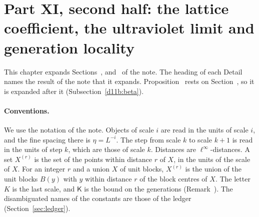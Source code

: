 


\section{Part XI, second half: the lattice coefficient, the ultraviolet limit and generation locality}\label{d11b}

This chapter expands Sections~,  and~ of the note. The heading of each Detail names the result of the note that it expands. Proposition~ rests on Section~, so it is expanded after it (Subsection~\ref{d11b:beta}).

\paragraph{Conventions.} We use the notation of the note. Objects of scale $i$ are read in the units of scale $i$, and the fine spacing there is $\eta=L^{-i}$. The step from scale $k$ to scale $k+1$ is read in the units of step $k$, which are those of scale $k$. Distances are $\ell^\infty$-distances. A set $X^{(r)}$ is the set of the points within distance $r$ of $X$, in the units of the scale of $X$. For an integer $r$ and a union $X$ of unit blocks, $X^{(r)}$ is the union of the unit blocks $B(y)$ with $y$ within distance $r$ of the block centres of $X$. The letter $K$ is the last scale, and $\mathsf K$ is the bound on the generations (Remark~). The disambiguated names of the constants are those of the ledger (Section~\ref{sec:ledger}).

